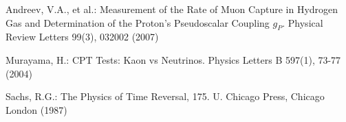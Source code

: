 \begin{thebibliography}{}
Andreev, V.A., et al.:
Measurement of the Rate of Muon Capture in Hydrogen Gas and 
Determination of the Proton's Pseudoscalar Coupling $g_P$.
Physical Review Letters 99(3), 032002 (2007)

Murayama, H.:
CPT Tests: Kaon vs Neutrinos.
Physics Letters B 597(1), 73-77 (2004)

Sachs, R.G.:
The Physics of Time Reversal, 175.
U. Chicago Press, Chicago London (1987)

\end{thebibliography}




